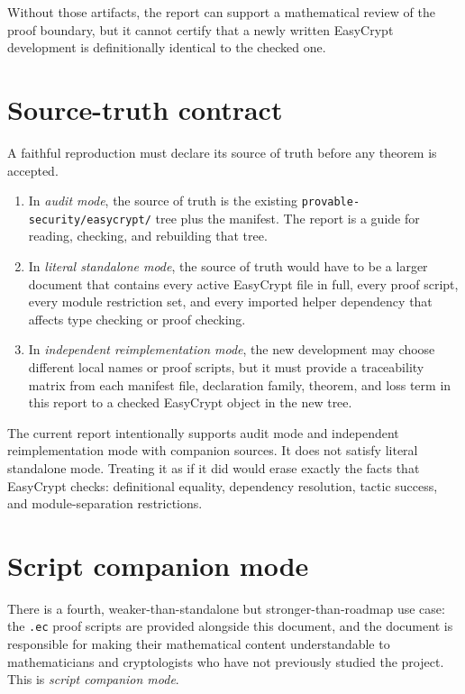 \documentclass[11pt]{report}
\DeclareRobustCommand{\file}[1]{\ifmmode\text{\nolinkurl{#1}}\else\nolinkurl{#1}\fi}
\theoremstyle{definition}
\theoremstyle{plain}
\begin{document}
Without those artifacts, the report can support a mathematical review of the
proof boundary, but it cannot certify that a newly written EasyCrypt
development is definitionally identical to the checked one.

\section{Source-truth contract}

A faithful reproduction must declare its source of truth before any theorem is
accepted.

\begin{enumerate}
\item In \emph{audit mode}, the source of truth is the existing
\file{provable-security/easycrypt/} tree plus the manifest.  The report is a
guide for reading, checking, and rebuilding that tree.
\item In \emph{literal standalone mode}, the source of truth would have to be a
larger document that contains every active EasyCrypt file in full, every proof
script, every module restriction set, and every imported helper dependency that
affects type checking or proof checking.
\item In \emph{independent reimplementation mode}, the new development may
choose different local names or proof scripts, but it must provide a
traceability matrix from each manifest file, declaration family, theorem, and
loss term in this report to a checked EasyCrypt object in the new tree.
\end{enumerate}

The current report intentionally supports audit mode and independent
reimplementation mode with companion sources.  It does not satisfy literal
standalone mode.  Treating it as if it did would erase exactly the facts that
EasyCrypt checks: definitional equality, dependency resolution, tactic success,
and module-separation restrictions.

\section{Script companion mode}

There is a fourth, weaker-than-standalone but stronger-than-roadmap use case:
the \file{.ec} proof scripts are provided alongside this document, and the
document is responsible for making their mathematical content understandable to
mathematicians and cryptologists who have not previously studied the project.
This is \emph{script companion mode}.
\end{document}
